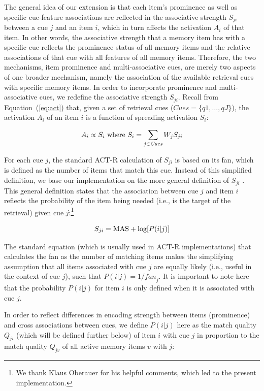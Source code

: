 \documentclass{cambridge7A}\usepackage[]{graphicx}\usepackage[]{color}
\begin{document}
The general idea of our extension is that each item's prominence as well as specific cue-feature associations are reflected in the associative strength $S_{ji}$ between a cue $j$ and an item $i$, which in turn affects the activation $A_i$ of that item.
In other words, the associative strength that a memory item has with a specific cue reflects the prominence status of all memory items and the relative associations of that cue with all features of all memory items.
Therefore, the two mechanisms, item prominence and multi-associative cues, are merely two aspects of one broader mechanism, namely the association of the available retrieval cues with specific memory items.
In order to incorporate prominence and multi-associative cues, we redefine the associative strength $S_{ji}$.
Recall from Equation~(\ref{eq:act}) that, given a set of retrieval cues ($\textit{Cues} = \{q1,\dots,qJ\}$), the activation $A_i$ of an item $i$ is a function of spreading activation $S_i$:

\begin{equation}
A_i \propto S_i \hbox{ where } S_i = \sum\limits_{j \in \textit{Cues}} W_j S_{ji}
\end{equation}

  
For each cue $j$, the standard ACT-R calculation of $S_{ji}$ is based on its fan, which is defined as the number of items that match this cue. 
Instead of this simplified definition, we base our implementation on the more general definition of $S_{ji}$ \citep[p.\ 129]{SchneiderAnderson2012}. This general definition states that the association between cue $j$ and item $i$ reflects the probability of the item being needed (i.e., is the target of the retrieval) given cue $j$:\footnote{We thank Klaus Oberauer for his helpful comments, which led to the present implementation.}

\begin{equation}
	S_{ji} = \hbox{MAS} + \log [P(i|j)]
\end{equation}

The standard equation (which is usually used in ACT-R implementations) that calculates the fan as the number of matching items makes the simplifying assumption that all items associated with cue $j$ are equally likely (i.e., useful in the context of cue $j$), such that $P(i|j) = 1/\textit{fan}_j$. It is important to note here that the probability $P(i|j)$ for item $i$ is only defined when it is associated with cue $j$.

In order to reflect differences in encoding strength between items (prominence) and cross associations between cues, we define $P(i|j)$ here as the  match quality $Q_{ji}$ (which will be defined further below) of item $i$ with cue $j$ in proportion to the match quality $Q_{jv}$ of all active memory items $v$ with $j$:
\end{document}

